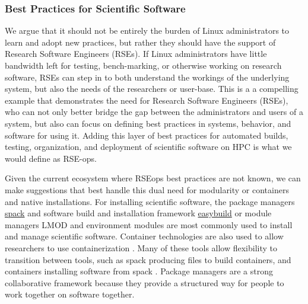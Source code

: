 
\subsubsection{Best Practices for Scientific Software}

We argue that it should not be entirely the burden of Linux administrators to learn and adopt new practices, but rather they should have the support of Research Software Engineers (RSEs). If Linux administrators have little bandwidth left for testing, bench-marking, or otherwise working on research software, RSEs can step in to both understand the workings of the underlying system, but also the needs of the researchers or user-base. This is a a compelling example that demonstrates the need for Research Software Engineers (RSEs), who can not only better bridge the gap between the administrators and users of a system, but also can focus on defining best practices in systems, behavior, and software for using it. Adding this layer of best practices for automated builds, testing, organization, and deployment of scientific software on HPC is what we would define as RSE-ops.

Given the current ecosystem where RSE\-ops best practices are not known, we can make suggestions that best handle this dual need for modularity or containers and native installations.
For installing scientific software, the package managers \href{https://github.com/spack/spack}{spack} and software build and installation framework \href{https://docs.easybuild.io/en/latest/Introduction.html}{easybuild} or module managers LMOD and environment modules \cite{LMOD,environment-modules} are most commonly used to install and manage scientific software. 
Container technologies are also used to allow researchers to use containerization \cite{charlie,podman,singularity,shifter}. Many of these tools allow flexibility to transition between tools, such as spack producing files to build containers, and containers installing software from spack \cite{autamus}. Package managers are a strong collaborative framework because they provide a structured way for people to work together on software together.

